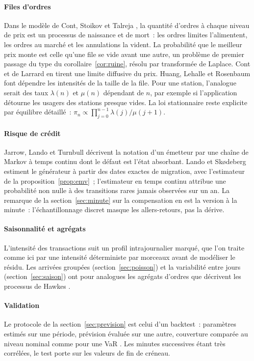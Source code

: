 \documentclass[10pt,a4paper,twocolumn]{article}
\theoremstyle{enonce}
\theoremstyle{defi}
\begin{document}
\paragraph{Files d'ordres} Dans le modèle de Cont, Stoikov et Talreja \cite{CST10}, la quantité d'ordres à chaque niveau de prix est un processus de naissance et de mort~: les ordres limites l'alimentent, les ordres au marché et les annulations la vident. La probabilité que le meilleur prix monte est celle qu'une file se vide avant une autre, un problème de premier passage du type du corollaire~\ref{cor:ruine}, résolu par transformée de Laplace. Cont et de Larrard \cite{CdL13} en tirent une limite diffusive du prix. Huang, Lehalle et Rosenbaum \cite{HLR15} font dépendre les intensités de la taille de la file. Pour une station, l'analogue serait des taux $\lambda(n)$ et $\mu(n)$ dépendant de $n$, par exemple si l'application détourne les usagers des stations presque vides. La loi stationnaire reste explicite par équilibre détaillé~: $\pi_n\propto\prod_{j=0}^{n-1}\lambda(j)/\mu(j+1)$.

\paragraph{Risque de crédit} Jarrow, Lando et Turnbull \cite{JLT97} décrivent la notation d'un émetteur par une chaîne de Markov à temps continu dont le défaut est l'état absorbant. Lando et Skødeberg \cite{LS02} estiment le générateur à partir des dates exactes de migration, avec l'estimateur de la proposition~\ref{prop:emv}~; l'estimateur en temps continu attribue une probabilité non nulle à des transitions rares jamais observées sur un an. La remarque de la section~\ref{sec:minute} sur la compensation en est la version à la minute~: l'échantillonnage discret masque les allers-retours, pas la dérive.

\paragraph{Saisonnalité et agrégats} L'intensité des transactions suit un profil intrajournalier marqué, que l'on traite comme ici par une intensité déterministe par morceaux avant de modéliser le résidu. Les arrivées groupées (section~\ref{sec:poisson}) et la variabilité entre jours (section~\ref{sec:saison}) ont pour analogues les agrégats d'ordres que décrivent les processus de Hawkes \cite{BMM15}.

\paragraph{Validation} Le protocole de la section~\ref{sec:prevision} est celui d'un backtest~: paramètres estimés sur une période, prévision évaluée sur une autre, couverture comparée au niveau nominal comme pour une VaR \cite{Kup95}. Les minutes successives étant très corrélées, le test porte sur les valeurs de fin de créneau.
\end{document}

